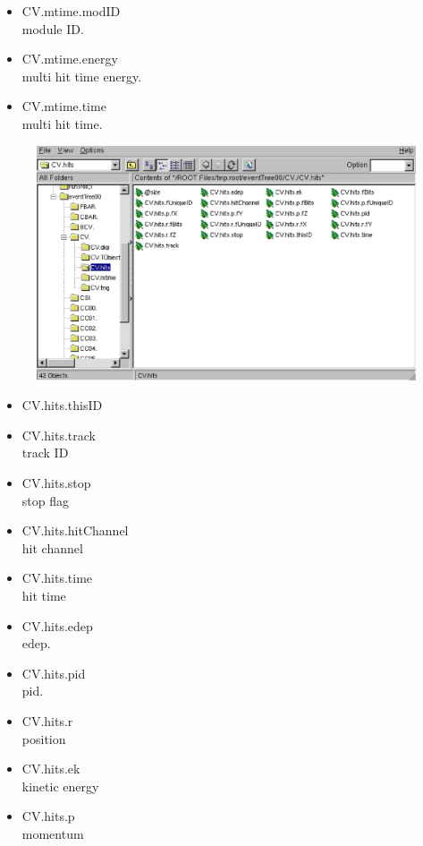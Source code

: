 \documentclass[a4paper,12pt]{article}
\begin{document}
    \begin{itemize}
     \item CV.mtime.modID\\
	   module ID.
     \item CV.mtime.energy\\
	   multi hit time energy.
     \item CV.mtime.time\\
	   multi hit time.
    \end{itemize}
    
    \begin{figure}[H]
     \begin{center}
      \includegraphics[scale=0.5]{xwd/hit.eps}
     \end{center}
     \caption{}
    \end{figure}

    \begin{itemize}
     \item CV.hits.thisID
     \item CV.hits.track\\
	   track ID
     \item CV.hits.stop\\
	   stop flag
     \item CV.hits.hitChannel\\
	   hit channel
     \item CV.hits.time\\
	   hit time
     \item CV.hits.edep\\
	   edep.
     \item CV.hits.pid\\
	   pid.
     \item CV.hits.r\\
	   position
     \item CV.hits.ek\\
	   kinetic energy
     \item CV.hits.p\\
	   momentum
    \end{itemize}
    
\end{document}
